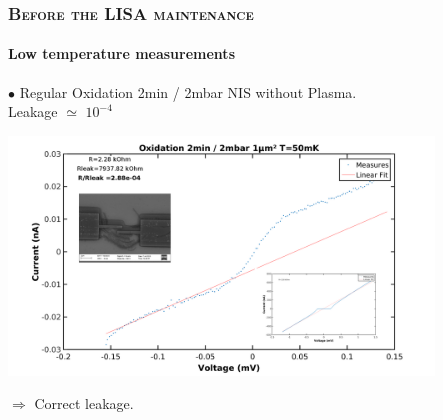 \documentclass[handout]{beamer}
\begin{document}
    \begin{frame}
        \frametitle{\textsc{Before the LISA maintenance}}
        \framesubtitle{Low temperature measurements}

        $\bullet$ Regular Oxidation 2min / 2mbar NIS without Plasma.\\
        \hspace{4.7cm}Leakage $\simeq$ $10^{-4}$
      
       \includegraphics[width=320pt]{BeforeLISAOx.png}
        
        $\Longrightarrow$ Correct leakage.     
        
    \end{frame}
    
\end{document}
